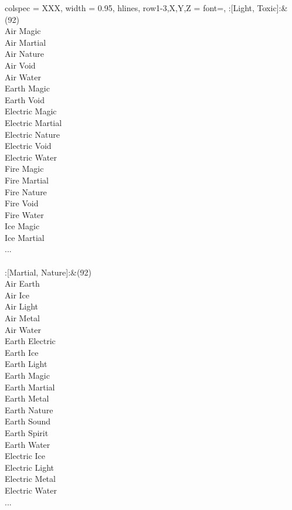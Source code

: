 \begin{longtblr}[
	caption = {2v2 Defending Weak},
	label = {2v2-Defending-Weak},
]{
	colspec = {XXX}, width = 0.95\linewidth,
	hlines,
	row{1-3,X,Y,Z} = {font=\bfseries},
}
	:[Light, Toxic]:&{(92)\\
	Air Magic \\
	Air Martial \\
	Air Nature \\
	Air Void \\
	Air Water \\
	Earth Magic \\
	Earth Void \\
	Electric Magic \\
	Electric Martial \\
	Electric Nature \\
	Electric Void \\
	Electric Water \\
	Fire Magic \\
	Fire Martial \\
	Fire Nature \\
	Fire Void \\
	Fire Water \\
	Ice Magic \\
	Ice Martial \\
	...\\
	}\\

	:[Martial, Nature]:&{(92)\\
	Air Earth \\
	Air Ice \\
	Air Light \\
	Air Metal \\
	Air Water \\
	Earth Electric \\
	Earth Ice \\
	Earth Light \\
	Earth Magic \\
	Earth Martial \\
	Earth Metal \\
	Earth Nature \\
	Earth Sound \\
	Earth Spirit \\
	Earth Water \\
	Electric Ice \\
	Electric Light \\
	Electric Metal \\
	Electric Water \\
	...\\
	}\\


\end{longtblr}
